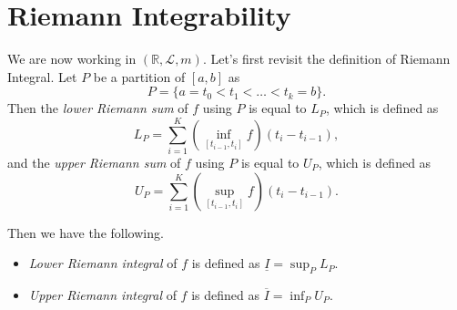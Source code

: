 \section{Riemann Integrability}
We are now working in \((\mathbb{R} , \mathcal{L} , m)\). Let's first revisit the definition of Riemann Integral. Let \(P\) be a partition of \([a, b]\) as
\[
	P = \{a = t_0 < t_1 < \dots < t_k = b \}.
\]
Then the \emph{lower Riemann sum} of \(f\) using \(P\) is equal to \(L_P\), which is defined as
\[
	L_{P} = \sum_{i=1}^{K} \left(\inf _{[t_{i-1}, t_{i}]} f \right)(t_{i} - t_{i - 1}),
\]
and the \emph{upper Riemann sum} of \(f\) using \(P\) is equal to \(U_P\), which is defined as
\[
	U_{P} = \sum_{i=1}^{K} \left(\sup _{[t_{i-1}, t_{i}]} f \right)(t_{i} - t_{i - 1}).
\]

Then we have the following.
\begin{itemize}
	\item \emph{Lower Riemann integral} of \(f\) is defined as \(\underline{I} = \sup_P L_{P} \).
	\item \emph{Upper Riemann integral} of \(f\) is defined as \(\overline{I}  = \inf_P U_{P} \).
\end{itemize}

